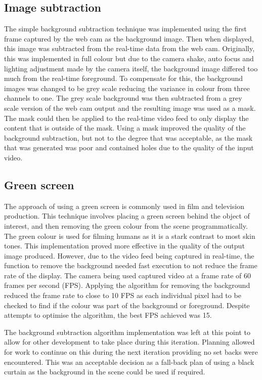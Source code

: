 \subsection{Image subtraction}
The simple background subtraction technique was implemented using the first frame captured by the web cam as the background image. Then when displayed, this image was subtracted from the real-time data from the web cam. Originally, this was implemented in full colour but due to the camera shake, auto focus and lighting adjustment made by the camera itself, the background image differed too much from the real-time foreground. To compensate for this, the background images was changed to be grey scale reducing the variance in colour from three channels to one. The grey scale background was then subtracted from a grey scale version of the web cam output and the resulting image was used as a mask. The mask could then be applied to the real-time video feed to only display the content that is outside of the mask. Using a mask improved the quality of the background subtraction, but not to the degree that was acceptable, as the mask that was generated was poor and contained holes due to the quality of the input video.

\subsection{Green screen}
The approach of using a green screen is commonly used in film and television production. This technique involves placing a green screen behind the object of interest, and then removing the green colour from the scene programmatically. The green colour is used for filming humans as it is a stark contrast to most skin tones. This implementation proved more effective in the quality of the output image produced. However, due to the video feed being captured in real-time, the function to remove the background needed fast execution to not reduce the frame rate of the display. The camera being used captured video at a frame rate of 60 frames per second (FPS). Applying the algorithm for removing the background reduced the frame rate to close to 10 FPS as each individual pixel had to be checked to find if the colour was part of the background or foreground. Despite attempts to optimise the algorithm, the best FPS achieved was 15.

The background subtraction algorithm implementation was left at this point to allow for other development to take place during this iteration. Planning allowed for work to continue on this during the next iteration providing no set backs were encountered. This was an acceptable decision as a fall-back plan of using a black curtain as the background in the scene could be used if required.

